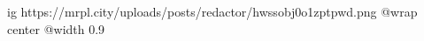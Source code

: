  
 
 
 
 

\ifcmt
  ig https://mrpl.city/uploads/posts/redactor/hwssobj0o1zptpwd.png
  @wrap center
  @width 0.9
\fi
